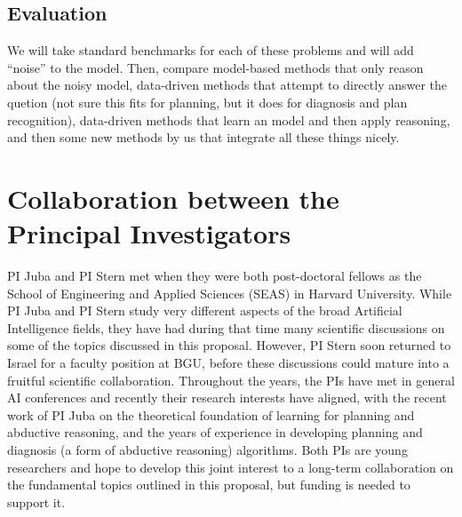 \documentclass[12pt]{article}
\newcommand{\note}[1]{\textbf{\textit{#1}}}
\begin{document}
\subsection{Evaluation}

We will take standard benchmarks for each of these problems and will add ``noise'' to the model. Then, compare model-based methods that only reason about the noisy model, data-driven methods that attempt to directly answer the quetion (not sure this fits for planning, but it does for diagnosis and plan recognition), data-driven methods that learn an model and then apply reasoning, 
and then some new methods by us that integrate all these things nicely. 



\section{Collaboration between the Principal Investigators}
PI Juba and PI Stern met when they were both post-doctoral fellows as the School of Engineering and Applied Sciences (SEAS) in Harvard University. 
While PI Juba and PI Stern study very different aspects of the broad Artificial Intelligence fields, they have had during that time many scientific discussions on some of the topics discussed in this proposal. However, PI Stern soon returned to Israel for a faculty position at BGU, before these discussions could mature into a fruitful scientific collaboration. 
Throughout the years, the PIs have met in general AI conferences
and recently their research interests have aligned, 
with the recent work of PI Juba on the theoretical foundation of learning for planning and abductive reasoning, and the years of experience in developing planning and diagnosis (a form of abductive reasoning) algorithms. 
Both PIs are young researchers and hope to develop this joint interest to a long-term collaboration on the fundamental topics outlined in this proposal, but funding is needed to support it.  

\end{document}
